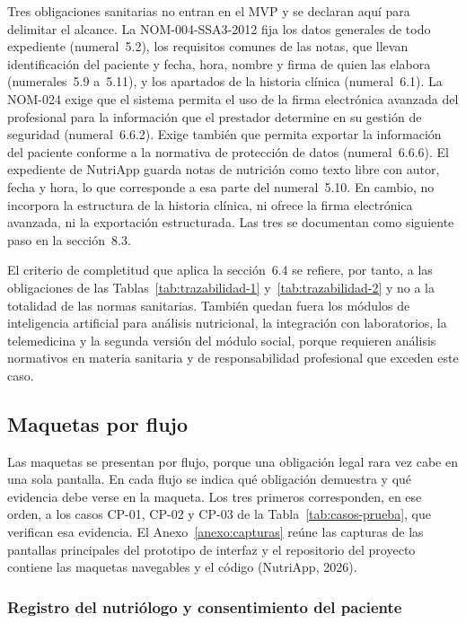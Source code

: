 \documentclass[12pt, a4paper]{article}
\begin{document}
Tres obligaciones sanitarias no entran en el MVP y se declaran aquí para
delimitar el alcance. La NOM-004-SSA3-2012 fija los datos generales de
todo expediente (numeral~5.2), los requisitos comunes de las notas, que
llevan identificación del paciente y fecha, hora, nombre y firma de
quien las elabora (numerales~5.9 a~5.11), y los apartados de la historia
clínica (numeral~6.1). La NOM-024 exige que el sistema permita el uso de
la firma electrónica avanzada del profesional para la información que el
prestador determine en su gestión de seguridad (numeral~6.6.2). Exige
también que permita exportar la información del paciente conforme a la
normativa de protección de datos (numeral~6.6.6). El expediente de
NutriApp guarda notas de nutrición como texto libre con autor, fecha y
hora, lo que corresponde a esa parte del numeral~5.10. En cambio, no
incorpora la estructura de la historia clínica, ni ofrece la firma
electrónica avanzada, ni la exportación estructurada. Las tres se
documentan como siguiente paso en la sección~8.3.
 
El criterio de completitud que aplica la sección~6.4 se refiere, por
tanto, a las obligaciones de las Tablas~\ref{tab:trazabilidad-1}
y~\ref{tab:trazabilidad-2} y no a la totalidad de las normas
sanitarias. También quedan fuera los módulos de inteligencia
artificial para análisis nutricional, la integración con laboratorios,
la telemedicina y la segunda versión del módulo social, porque
requieren análisis normativos en materia sanitaria y de
responsabilidad profesional que exceden este caso.
 
\subsection{Maquetas por flujo}
 
Las maquetas se presentan por flujo, porque una obligación legal rara
vez cabe en una sola pantalla. En cada flujo se indica qué obligación
demuestra y qué evidencia debe verse en la maqueta. Los tres primeros
corresponden, en ese orden, a los casos CP-01, CP-02 y CP-03 de la
Tabla~\ref{tab:casos-prueba}, que verifican esa evidencia. El
Anexo~\ref{anexo:capturas} reúne las capturas de las pantallas principales del prototipo de interfaz y el
repositorio del proyecto contiene las maquetas navegables y el código
(NutriApp, 2026).
 
\subsubsection{Registro del nutriólogo y consentimiento del paciente}
 
\end{document}
